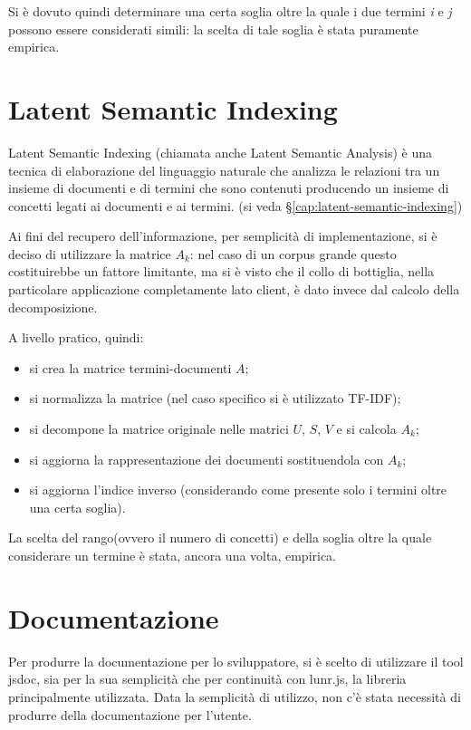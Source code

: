 Si è dovuto quindi determinare una certa soglia oltre la quale i due termini \textit{i} e \textit{j} possono essere considerati simili: la scelta di tale soglia è stata puramente empirica.

\section{Latent Semantic Indexing}
\label{comeLSI}
Latent Semantic Indexing (chiamata anche Latent Semantic Analysis) è una tecnica di elaborazione del linguaggio naturale che analizza le relazioni tra un insieme di documenti e di termini che sono contenuti producendo un insieme di concetti legati ai documenti e ai termini. (si veda §\ref{cap:latent-semantic-indexing})

Ai fini del recupero dell'informazione, per semplicità di implementazione, si è deciso di utilizzare la matrice $A_k$: nel caso di un \gls{corpus} grande questo costituirebbe un fattore limitante, ma si è visto che il collo di bottiglia, nella particolare applicazione completamente lato client, è dato invece dal calcolo della decomposizione.

A livello pratico, quindi:
\begin{itemize}
    \item si crea la matrice termini-documenti $A$;
    \item si normalizza la matrice (nel caso specifico si è utilizzato TF-IDF);
    \item si decompone la matrice originale nelle matrici $U$, $S$, $V$ e si calcola $A_k$;
    \item si aggiorna la rappresentazione dei documenti sostituendola con $A_k$;
    \item si aggiorna l'indice inverso (considerando come presente solo i termini oltre una certa soglia).    
\end{itemize}

La scelta del rango(ovvero il numero di concetti) e della soglia oltre la quale considerare un termine è stata, ancora una volta, empirica.

\section{Documentazione}
Per produrre la documentazione per lo sviluppatore, si è scelto di utilizzare il tool \gls{jsdoc}, sia per la sua semplicità che per continuità con lunr.js, la libreria principalmente utilizzata. Data la semplicità di utilizzo, non c'è stata necessità di produrre della documentazione per l'utente.
